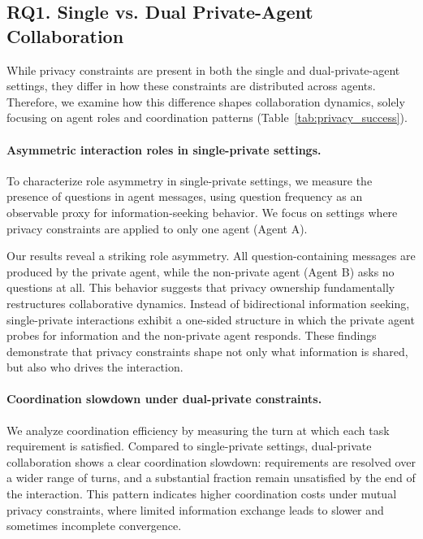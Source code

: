 % 


\subsection{RQ1. Single vs. Dual Private-Agent Collaboration}
\label{sec:analysis_RQ1}

While privacy constraints are present in both the single and dual-private-agent settings, they differ in how these constraints are distributed across agents. 
Therefore, we examine how this difference shapes collaboration dynamics, solely focusing on agent roles and coordination patterns (Table~\ref{tab:privacy_success}).


\paragraph{Asymmetric interaction roles in single-private settings.}
\label{sec:asymmetric_roles}

To characterize role asymmetry in single-private settings, we measure the presence of questions in agent messages, using question frequency as an observable proxy for information-seeking behavior. 
We focus on settings where privacy constraints are applied to only one agent (Agent A).



Our results reveal a striking role asymmetry. 
All question-containing messages are produced by the private agent, while the non-private agent (Agent B) asks no questions at all. 
This behavior suggests that privacy ownership fundamentally restructures collaborative dynamics. 
Instead of bidirectional information seeking, single-private interactions exhibit a one-sided structure in which the private agent probes for information and the non-private agent responds.
These findings demonstrate that privacy constraints shape not only what information is shared, but also who drives the interaction.

\paragraph{Coordination slowdown under dual-private constraints.}
\label{sec:dual_private_slowdown}

We analyze coordination efficiency by measuring the turn at which each task requirement is satisfied.
Compared to single-private settings, dual-private collaboration shows a clear coordination slowdown: requirements are resolved over a wider range of turns, and a substantial fraction remain unsatisfied by the end of the interaction.
This pattern indicates higher coordination costs under mutual privacy constraints, where limited information exchange leads to slower and sometimes incomplete convergence.



